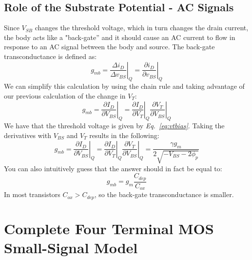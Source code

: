 \subsection{Role of the Substrate Potential - AC Signals}
Since $V_{SB}$ changes the threshold voltage, which in turn changes the drain current, the body acts like a "back-gate” and it should cause an AC current to flow in response to an AC signal between the body and source.  The back-gate transconductance is defined as:
    \begin{equation} 
        {g_{mb}} = {\left. {\frac{{\Delta {i_D}}}{{\Delta {v_{BS}}}}} \right|_Q} = {\left. {\frac{{\partial {i_D}}}{{\partial {v_{BS}}}}} \right|_Q} 
    \end{equation}
We can simplify this calculation by using the chain rule and taking advantage of our previous calculation of the change in $V_T$:
    \begin{equation}
        {g_{mb}} = {\left. {\frac{{\partial {I_D}}}{{\partial {V_{BS}}}}} \right|_Q} = {\left. {\frac{{\partial {I_D}}}{{\partial {V_{T}}}}} \right|_Q}{\left. {\frac{{\partial {V_{T}}}}{{\partial {V_{BS}}}}} \right|_Q}
    \end{equation}
We have that the threshold voltage is given by \emph{Eq.~\ref{eq:vtbias}}.  Taking the derivatives with $V_{BS}$ and $V_T$ results in the following:
    \begin{equation}
        {g_{mb}} = {\left. {\frac{{\partial {I_D}}}{{\partial {V_{BS}}}}} \right|_Q} = {\left. {\frac{{\partial {I_D}}}{{\partial {V_{T}}}}} \right|_Q}{\left. {\frac{{\partial {V_{T}}}}{{\partial {V_{BS}}}}} \right|_Q} = \frac{{\gamma {g_m}}}{{2\sqrt { - {V_{BS}} - 2{\phi _p}} }}
    \end{equation}
You can also intuitively guess that the answer should in fact be equal to:
    \begin{equation}
        g_{mb} = g_m \frac{C_{dep}}{C_{ox}}
    \end{equation}
In most transistors $C_{ox} > C_{dep}$, so the back-gate transconductance is smaller.   
\section{Complete Four Terminal MOS Small-Signal Model}
